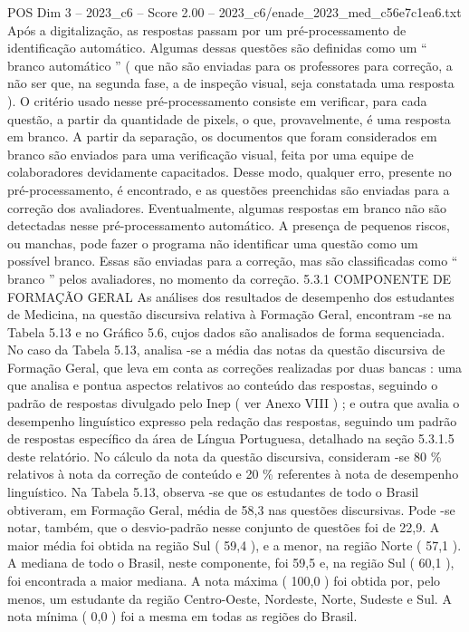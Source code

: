 \begin{textsample}{POS Dim 3 – 2023\_c6 – Score 2.00 – 2023\_c6/enade\_2023\_med\_c56e7c1ea6.txt}
Após a digitalização, as respostas passam por um pré-processamento de identificação automático.
Algumas dessas questões são definidas como um “ branco automático ” ( que não são enviadas para os professores para correção, a não ser que, na segunda fase, a de inspeção visual, seja constatada uma resposta ).
O critério usado nesse pré-processamento consiste em verificar, para cada questão, a partir da quantidade de pixels, o que, provavelmente, é uma resposta em branco.
A partir da separação, os documentos que foram considerados em branco são enviados para uma verificação visual, feita por uma equipe de colaboradores devidamente capacitados.
Desse modo, qualquer erro, presente no pré-processamento, é encontrado, e as questões preenchidas são enviadas para a correção dos avaliadores.
Eventualmente, algumas respostas em branco não são detectadas nesse pré-processamento automático.
A presença de pequenos riscos, ou manchas, pode fazer o programa não identificar uma questão como um possível branco.
Essas são enviadas para a correção, mas são classificadas como “ branco ” pelos avaliadores, no momento da correção. 5.3.1 COMPONENTE DE FORMAÇÃO GERAL As análises dos resultados de desempenho dos estudantes de Medicina, na questão discursiva relativa à Formação Geral, encontram -se na Tabela 5.13 e no Gráfico 5.6, cujos dados são analisados de forma sequenciada.
No caso da Tabela 5.13, analisa -se a média das notas da questão discursiva de Formação Geral, que leva em conta as correções realizadas por duas bancas : uma que analisa e pontua aspectos relativos ao conteúdo das respostas, seguindo o padrão de respostas divulgado pelo Inep ( ver Anexo VIII ) ; e outra que avalia o desempenho linguístico expresso pela redação das respostas, seguindo um padrão de respostas específico da área de Língua Portuguesa, detalhado na seção 5.3.1.5 deste relatório.
No cálculo da nota da questão discursiva, consideram -se 80 \% relativos à nota da correção de conteúdo e 20 \% referentes à nota de desempenho linguístico.
Na Tabela 5.13, observa -se que os estudantes de todo o Brasil obtiveram, em Formação Geral, média de 58,3 nas questões discursivas.
Pode -se notar, também, que o desvio-padrão nesse conjunto de questões foi de 22,9.
A maior média foi obtida na região Sul ( 59,4 ), e a menor, na região Norte ( 57,1 ).
A mediana de todo o Brasil, neste componente, foi 59,5 e, na região Sul ( 60,1 ), foi encontrada a maior mediana.
A nota máxima ( 100,0 ) foi obtida por, pelo menos, um estudante da região Centro-Oeste, Nordeste, Norte, Sudeste e Sul.
A nota mínima ( 0,0 ) foi a mesma em todas as regiões do Brasil.

\end{textsample}
